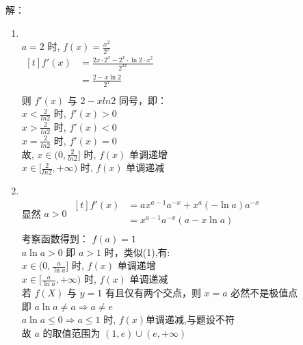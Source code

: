 \documentclass[class=ctexart,crop=false]{standalone}
\begin{document}
解：\\
\begin{enumerate}[label=(\arabic*)]
	\item \quad\\
	      $a=2$ 时, $f(x)=\frac{x^2}{2^x}$\\
	      $\begin{aligned}[t]
			      f'(x) & =\frac{2x \cdot2^x-2^x\cdot \ln{2}\cdot x^2}{2^{2x}} \\
			            & =\frac{2-x\ln{2}}{2^{x}}                             \\
		      \end{aligned}$\\
	      则 $f'(x)$ 与 $2-xln2$ 同号，即：\\
	      $x<\frac{2}{ln2}$ 时, $f'(x)>0$\\
	      $x>\frac{2}{ln2}$ 时, $f'(x)<0$\\
	      $x=\frac{2}{ln2}$ 时, $f'(x)=0$\\
	      故, $x \in (0,\frac{2}{ln2}]$ 时, $f(x)$ 单调递增\\
	      $x \in [\frac{2}{ln2},+\infty)$ 时, $f(x)$ 单调递减\\
	\item \quad\\
显然 $a>0$
$\begin{aligned}[t]
		f'(x) & =ax^{a-1}a^{-x}+x^a(-\ln{a})a^{-x} \\
		      & =x^{a-1}a^{-x}(a-x\ln{a})          \\
	\end{aligned}$\\
考察函数得到： $f(a)=1$\\
$a\ln{a}>0$ 即 $a>1$ 时，类似(1),有:\\
	      $x \in (0,\frac{a}{\ln{a}}]$ 时, $f(x)$ 单调递增\\
$x \in [\frac{a}{\ln{a}},+\infty)$ 时, $f(x)$ 单调递减\\
	      若 $f(X)$ 与 $y=1$ 有且仅有两个交点，则 $x=a$ 必然不是极值点\\
即 $a\ln{a} \neq a \Rightarrow a \neq e$\\
$a\ln{a} \leqslant 0 \Rightarrow a \leqslant 1$ 时,
$f(x)$单调递减,与题设不符\\
故 $a$ 的取值范围为 $(1,e)\cup (e,+\infty)$
\end{enumerate}
\end{document}
